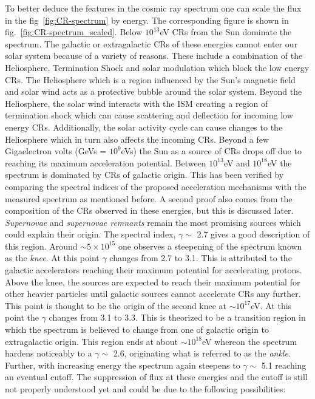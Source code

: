 To better deduce the features in the cosmic ray spectrum one can scale the flux in the fig~\ref{fig:CR-spectrum} by energy. The corresponding figure is shown in fig.~\ref{fig:CR-spectrum_scaled}. Below $10^{13}$eV CRs from the Sun dominate the spectrum. The galactic or extragalactic CRs of these energies cannot enter our solar system because of a variety of reasons. These include a combination of the Heliosphere, Termination Shock and solar modulation which block the low energy CRs. The Heliosphere which is a region influenced by the Sun's magnetic field and solar wind acts as a protective bubble around the solar system. Beyond the Heliosphere, the solar wind interacts with the ISM creating a region of termination shock which can cause scattering and deflection for incoming low energy CRs. Additionally, the solar activity cycle can cause changes to the Heliosphere which in turn also affects the incoming CRs. Beyond a few Gigaelectron volts (GeVs = $10^{9}$eVs) the Sun as a source of CRs drops off due to reaching its maximum acceleration potential. Between $10^{13}$eV and $10^{18}$eV the spectrum is dominated by CRs of galactic origin. This has been verified by comparing the spectral indices of the proposed acceleration mechanisms with the measured spectrum as mentioned before. A second proof also comes from the composition of the CRs observed in these energies, but this is discussed later. \textit{Supernovae} and \textit{supernovae remnants} remain the most promising sources which could explain their origin. The spectral index, $\gamma \sim$ 2.7 gives a good description of this region. Around $\sim5 \times 10^{15}$ one observes a steepening of the spectrum known as the \textit{knee}. At this point $\gamma$ changes from 2.7 to 3.1. This is attributed to the galactic accelerators reaching their maximum potential for accelerating protons. Above the knee, the sources are expected to reach their maximum potential for other heavier particles until galactic sources cannot accelerate CRs any further. This point is thought to be the origin of the second knee at $\sim 10^{17}$eV. At this point the $\gamma$ changes from 3.1 to 3.3. This is theorized to be a transition region in which the spectrum is believed to change from one of galactic origin to extragalactic origin. This region ends at about $\sim 10^{18}$eV whereon the spectrum hardens noticeably to a $\gamma \sim$ 2.6, originating what is referred to as the \textit{ankle}. Further, with increasing energy the spectrum again steepens to $\gamma \sim$ 5.1 reaching an eventual cutoff. The suppression of flux at these energies and the cutoff is still not properly understood yet and could be due to the following possibilities:

